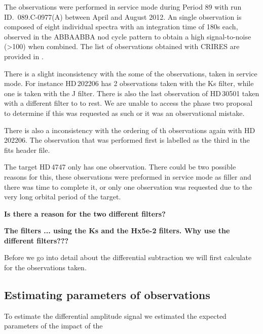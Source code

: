 The observations were performed in service mode during Period 89 with run ID.~089.C-0977(A) between April and August 2012. An single observation is composed of eight individual spectra with an integration time of 180\si{\second} each, observed in the {ABBAABBA} nod cycle pattern to obtain a high signal-to-noise (>100) when combined. The list of observations obtained with {CRIRES} are provided in .

There is a slight inconsistency with the some of the observations, taken in service mode. For instance {HD\,202206} has 2 observations taken with the Ks filter, while one is taken with the {J} filter. There is also the last observation of {HD\,30501} taken with a different filter to to rest. We are unable to access the phase two proposal to determine if this was requested as such or it was an observational mistake. 

There is also a inconsistency with the ordering of th observations again with {HD\,202206}. The observation that was performed first is labelled as the third in the fits header file. 

The target {HD\,4747} only has one observation. There could be two possible reasons for this, these observations were preformed in service mode as filler and there was time to complete it, or only one observation was requested due to the very long orbital period of the target.

\textbf{Is there a reason for the two different filters?}
 




\textbf{The filters ... using the {Ks} and the {Hx5e-2} filters. Why use the different filters???}

Before we go into detail about the differential subtraction we will first calculate for the observations taken.


\subsection{Estimating parameters of observations}
To estimate the differential amplitude signal we estimated the expected parameters of the impact of the






